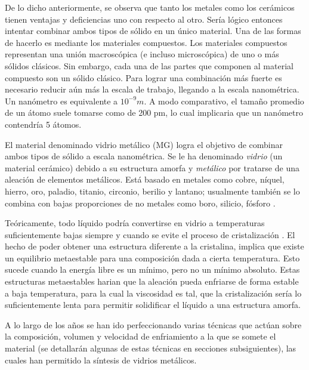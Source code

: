 De lo dicho anteriormente, se observa que tanto los metales como los cerámicos tienen ventajas y deficiencias uno con respecto al otro. Sería lógico entonces intentar combinar ambos tipos de sólido en un único material. Una de las formas de hacerlo es mediante los materiales compuestos. Los materiales compuestos representan una unión macroscópica (e incluso microscópica) de uno o más sólidos clásicos. Sin embargo, cada una de las partes que componen al material compuesto son un sólido clásico. Para lograr una combinación más fuerte es necesario reducir aún más la escala de trabajo, llegando a la escala nanométrica. Un nanómetro es equivalente a $10^{-9} m$. A modo comparativo, el tamaño promedio de un átomo suele tomarse como de 200 pm, lo cual implicaria que un nanómetro contendría 5 átomos.

El material denominado vidrio metálico (MG) logra el objetivo de combinar ambos tipos de sólido a escala nanométrica. Se le ha denominado \textit{vidrio} (un material cerámico) debido a su estructura amorfa y \textit{metálico} por tratarse de una aleación de elementos metálicos. Está basado en metales como cobre, níquel, hierro, oro, paladio, titanio, circonio, berilio y lantano; usualmente también se lo combina con bajas proporciones de no metales como boro, silicio, fósforo \citep{andrievski13}.

Teóricamente, todo líquido podría convertirse en vidrio a temperaturas suficientemente bajas siempre y cuando se evite el proceso de cristalización \citep{turnbull61}. El hecho de poder obtener una estructura diferente a la cristalina, implica que existe un equilibrio metaestable para una composición dada a cierta temperatura. Esto sucede cuando la energía libre es un mínimo, pero no un mínimo absoluto. Estas estructuras metaestables harian que la aleación pueda enfriarse de forma estable a baja temperatura, para la cual la viscosidad es tal, que la cristalización sería lo suficientemente lenta para permitir solidificar el líquido a una estructura amorfa.

A lo largo de los años se han ido perfeccionando varias técnicas que actúan sobre la composición, volumen y velocidad de enfriamiento a la que se somete el material (se detallarán algunas de estas técnicas en secciones subsiguientes), las cuales han permitido la síntesis de vidrios metálicos.


